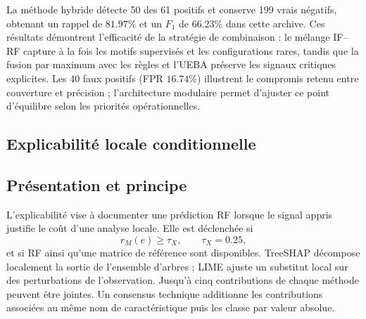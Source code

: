 \documentclass[11pt,a4paper,oneside]{report}
\theoremstyle{definition}
\theoremstyle{plain}
\begin{document}
\begin{table}[H]
\centering
\caption{Résultat archivé de l'hybride IF--RF avec fusion maximale, $n=300$, seuil $0.55$.}
\label{tab:method-hybrid-results}
\small
{}
\end{table}

La méthode hybride détecte 50 des 61 positifs et conserve 199 vrais négatifs,
obtenant un rappel de $81.97\%$ et un $F_1$ de $66.23\%$ dans cette archive. Ces
résultats démontrent l'efficacité de la stratégie de combinaison : le mélange
IF--RF capture à la fois les motifs supervisés et les configurations rares,
tandis que la fusion par maximum avec les règles et l'UEBA préserve les signaux
critiques explicites. Les 40 faux positifs (FPR $16.74\%$) illustrent le
compromis retenu entre couverture et précision ; l'architecture modulaire permet
d'ajuster ce point d'équilibre selon les priorités opérationnelles.

\subsection{Explicabilité locale conditionnelle}
\label{sec:ai-ro-xai}

\subsection*{Présentation et principe}

L'explicabilité vise à documenter une prédiction RF lorsque le signal appris justifie le coût d'une analyse locale. Elle est déclenchée si
\begin{equation}
r_M(e)\geq\tau_X,\qquad \tau_X=0.25,
\label{eq:ai-ro-xai-gate}
\end{equation}
et si RF ainsi qu'une matrice de référence sont disponibles. TreeSHAP décompose localement la sortie de l'ensemble d'arbres ; LIME ajuste un substitut local sur des perturbations de l'observation. Jusqu'à cinq contributions de chaque méthode peuvent être jointes. Un consensus technique additionne les contributions associées au même nom de caractéristique puis les classe par valeur absolue.
\end{document}
